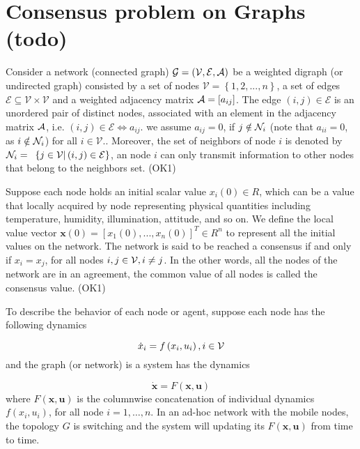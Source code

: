 
\section{\label{sec:Consensus-problem-on}Consensus problem on Graphs (todo)}

Consider a network (connected graph) $\mathcal{G}=\left(\mathcal{V},\mathcal{E},{\cal A}\right)$
be a weighted digraph (or undirected graph) consisted by a set of
nodes $\mathcal{V}=\left\{ 1,2,...,n\right\} $, a set of edges $\mathcal{E}\subseteq\mathcal{V}\times\mathcal{V}$
and a weighted adjacency matrix ${\cal A}=\left[a_{ij}\right]$. The
edge $\left(i,j\right)\in\mathfrak{\mathcal{E}}$ is an unordered
pair of distinct nodes, associated with an element in the adjacency
matrix ${\cal A}$, i.e. $\left(i,j\right)\in\mathfrak{\mathcal{E}}\Leftrightarrow a_{ij}$.
we assume $a_{ij}=0$, if $j\notin{\cal N}_{i}$ (note that $a_{ii}=0$,
as $i\notin{\cal N}_{i}$) for all $i\in\mathcal{V}$.. Moreover,
the set of neighbors of node $i$ is denoted by $\mathcal{N}_{i}=\text{ }\left\{ j\in{\cal V}|\left(i,j\right)\in\mathcal{E}\right\} $,
an node $i$ can only transmit information to other nodes that belong
to the neighbors set. (OK1)

Suppose each node holds an initial scalar value $x_{i}\left(0\right)\in R$,
which can be a value that locally acquired by node representing physical
quantities including temperature, humidity, illumination, attitude,
and so on. We define the local value vector $\mathbf{x}\left(0\right)=\left[x_{1}\left(0\right),...,x_{n}\left(0\right)\right]^{T}\in R^{n}$
to represent all the initial values on the network. The network is
said to be reached a consensus if and only if $x_{i}=x_{j}$, for
all nodes $i,j\in{\cal V},i\neq j$. In the other words, all the nodes
of the network are in an agreement, the common value of all nodes
is called the consensus value. (OK1)

To describe the behavior of each node or agent, suppose each node
has the following dynamics 

\begin{equation}
\dot{x}_{i}=f\left(x_{i},u_{i}\right),i\in{\cal V}
\end{equation}
and the graph (or network) is a system has the dynamics

\begin{equation}
\mathbf{\dot{x}}=F\left(\mathbf{x},\mathbf{u}\right)\label{eq:system dynamic}
\end{equation}
where $F\left(\mathbf{x},\mathbf{u}\right)$ is the columnwise concatenation
of individual dynamics $f\left(x_{i},u_{i}\right)$, for all node
$i=1,\ldots,n$. In an ad-hoc network with the mobile nodes, the topology
$G$\textbf{ }is switching and the system will updating its $F\left(\mathbf{x},\mathbf{u}\right)$
from time to time. 

